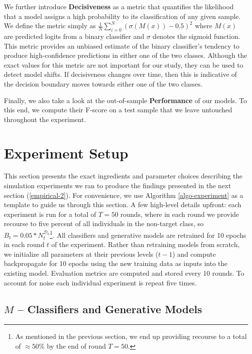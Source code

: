 \documentclass[conference,final,]{IEEEtran}
\begin{document}
We further introduce \textbf{Decisiveness} as a metric that quantifies the likelihood that a model assigns a high probability to its classification of any given sample. We define the metric simply as \({\frac{1}{N}}\sum_{i=0}^N(\sigma(M(x)) - 0.5)^2\) where \(M(x)\) are predicted logits from a binary classifier and \(\sigma\) denotes the sigmoid function. This metric provides an unbiased estimate of the binary classifier's tendency to produce high-confidence predictions in either one of the two classes. Although the exact values for this metric are not important for our study, they can be used to detect model shifts. If decisiveness changes over time, then this is indicative of the decision boundary moves towards either one of the two classes.

Finally, we also take a look at the out-of-sample \textbf{Performance} of our models. To this end, we compute their F-score on a test sample that we leave untouched throughout the experiment.

\hypertarget{empirical}{%
\section{Experiment Setup}\label{empirical}}

This section presents the exact ingredients and parameter choices describing the simulation experiments we ran to produce the findings presented in the next section (\ref{empirical-2}). For convenience, we use Algorithm \ref{algo-experiment} as a template to guide us through this section. A few high-level details upfront: each experiment is run for a total of \(T=50\) rounds, where in each round we provide recourse to five percent of all individuals in the non-target class, so \(B_t=0.05 * N_t^{\mathcal{D}_0}\)\footnote{As mentioned in the previous section, we end up providing recourse to a total of \(\approx50\%\) by the end of round \(T=50\).}. All classifiers and generative models are retrained for 10 epochs in each round \(t\) of the experiment. Rather than retraining models from scratch, we initialize all parameters at their previous levels (\(t-1\)) and compute backpropagate for 10 epochs using the new training data as inputs into the existing model. Evaluation metrics are computed and stored every 10 rounds. To account for noise each individual experiment is repeat five times.

\hypertarget{empirical-classifiers}{%
\subsection{\texorpdfstring{\(M\) -- Classifiers and Generative Models}{M -- Classifiers and Generative Models}}\label{empirical-classifiers}}
\end{document}
